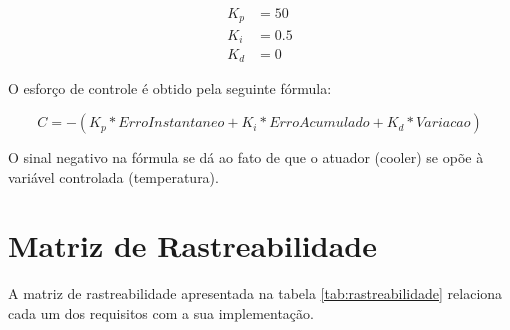 \documentclass{article}
\begin{document}
\begin{align*}
K_p &= 50\\
K_i &= 0.5\\
K_d &= 0
\end{align*}

O esforço de controle é obtido pela seguinte fórmula:

\begin{equation}
C = - (K_p * ErroInstantaneo + K_i * ErroAcumulado + K_d * Variacao)
\end{equation}

O sinal negativo na fórmula se dá ao fato de que o atuador (cooler) se opõe à variável controlada (temperatura).

\section{Matriz de Rastreabilidade}
A matriz de rastreabilidade apresentada na tabela \ref*{tab:rastreabilidade} relaciona cada um dos requisitos com a sua implementação.
\end{document}
